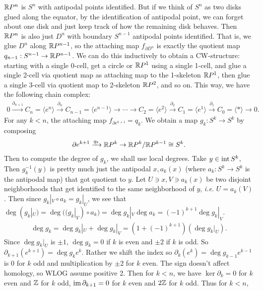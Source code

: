 \documentclass[12pt]{article}
\begin{document}
\begin{problem}[7]
$ \mathbb{R} P^{n}$ is $ S^{n}$ with antipodal points identified. But if we think of $ S^{n}$ as two disks glued along the equator, by the identification of antipodal point, we can forget about one disk and just keep track of how the remaining disk behaves. Then $ \mathbb{R} P^{n}$ is also just $ D^{n}$ with boundary $ S^{n-1}$ antipodal points identified. That is, we glue $ D^{n}$ along $ \mathbb{R} P^{n-1}$, so the attaching map $ f_{\partial D^{n}}$ is exactly the quotient map $ q_{n-1}: S^{n-1} \to \mathbb{R} P^{n-1}$. We can do this inductively to obtain a CW-structure: starting with a single 0-cell, get a circle or $ \mathbb{R} P^{1}$ using a single 1-cell, and glue a single 2-cell via quotient map as attaching map to the 1-skeleton $ \mathbb{R} P^{1}$, then glue a single 3-cell via quotient map to 2-skeleton $ \mathbb{R} P^{2}$, and so on. This way, we have the following chain complex:
\begin{align*}
	0 \xrightarrow{ \partial_{n+1}} C_n= \langle e^{n} \rangle \xrightarrow{ \partial _n}  C_{n-1} = \langle e^{n-1} \rangle \to \cdots \to C_2 = \langle e^{2} \rangle \xrightarrow{ \partial _2} C_1 = \langle e^{1} \rangle \xrightarrow{ \partial _1}  C_0 = \langle * \rangle \to 0    .
\end{align*}
For any $ k < n$, the attaching map  $ f_{\partial e^{k+1}} = q_k$. We obtain a map $ g_k : S^{k} \to S^{k}$ by composing
\begin{align*}
	\partial e^{k+1} \xrightarrow{ q_k} \mathbb{R} P^{k} \to \mathbb{R} P^{k} / \mathbb{R} P^{k-1} \cong S^{k}.  
\end{align*}
Then to compute the degree of $ g_k$, we shall use local degrees. Take $ y \in \operatorname{int} S^{k}$, Then $ g_k^{-1}(y)$ is pretty much just the antipodal $ x, a_k(x)$ (where $ a_k:S^{k} \to S^{k}$ is the antipodal map) that got quotient to  $ y$. Let $ U \ni x,V \ni a_k(x)$ be two disjoint neighborhoods that get identified to the same neighborhood of  $ y$, \emph{i.e.} $ U = a_k(V)$. Then since $ g_k|_V \circ a_k = g_k|_U$, we see that $ \deg (g_k|_U) = \deg((g_k|_V) \circ a_k) = \deg g_k|_V \deg a_k =(-1)^{k+1} \deg g_k|_V $.
\begin{align*}
	\deg g_k = \deg g_k|_U + \deg g_k|_V = (1+(-1)^{k+1}) (\deg g_k|_U) .
\end{align*}
Since $ \deg g_k|_U$ is $ \pm 1$,  $ \deg g_k = 0$ if $ k$ is even and  $ \pm 2$ if  $ k$ is odd. So  $ \partial_{k+1}(e^{k+1}) = \deg g_k e^{k}$. Rather we shift the index so $ \partial_k(e^{k}) = \deg g_{k-1} e^{k-1}$ is 0 for $ k$ odd and  multiplication by $ \pm 2$ for $ k$ even. The sign doesn't affect homology, so WLOG assume positive 2. Then for $ k<n$, we have $ \ker \partial_k = 0$ for $ k$ even and  $ \mathbb{Z}$ for $ k$ odd,  $ \operatorname{im} \partial_{k+1} = 0$ for $ k$ even and  $ 2\mathbb{Z}$ for  $ k$ odd. Thus for $ k<n$,

\end{problem}
\end{document}
